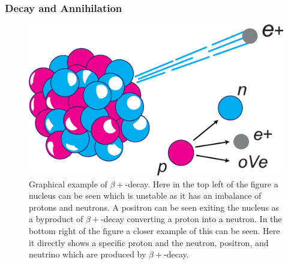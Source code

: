             \subsubsection{Decay and Annihilation} \label{sec:decay_and_annihilation}
                \begin{figure}
                    \centering
                    
                    \includegraphics[width=1.0\linewidth]{figures/background_beta_plus_decay.png}
                    
                    \captionsetup{singlelinecheck=false}
                    \caption{
                        Graphical example of $\beta+$-decay. Here in the top left of the figure a nucleus can be seen which is unstable as it has an imbalance of protons and neutrons. A positron can be seen exiting the nucleus as a byproduct of $\beta+$-decay converting a proton into a neutron. In the bottom right of the figure a closer example of this can be seen. Here it directly shows a specific proton and the neutron, positron, and neutrino which are produced by $\beta+$-decay.
                    }
                    \label{fig:decay_and_annihilation_beta_plus_decay}
                \end{figure}

